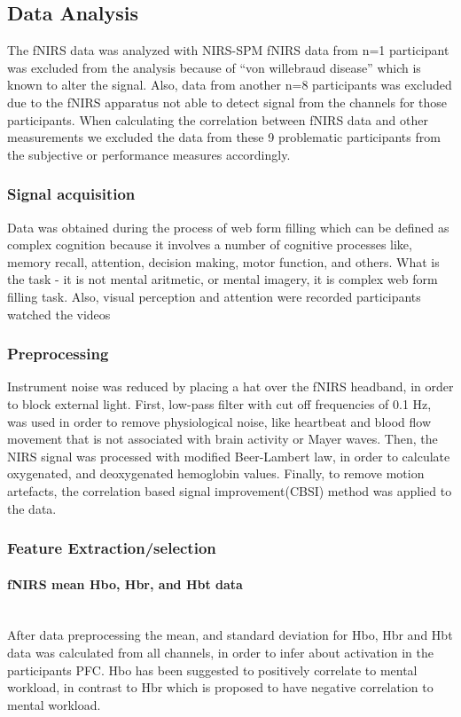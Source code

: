 \documentclass[a4paper]{report}
\begin{document}
		\subsection{Data Analysis}
		The fNIRS data was analyzed with NIRS-SPM\cite{ye2009nirs}		
		fNIRS data from n=1 participant was excluded from the analysis because of ``von willebraud disease'' which is known to alter the signal. Also, data from another n=8 participants was excluded due to the fNIRS apparatus not able to detect signal from the channels for those participants. When calculating the correlation between fNIRS data and other measurements we excluded the data from these 9 problematic participants from the subjective or performance measures accordingly.
			\subsubsection{Signal acquisition}
			Data was obtained during the process of web form filling which can be defined as complex cognition because it involves a number of cognitive processes like, memory recall, attention, decision making, motor function, and others. What is the task - it is not mental aritmetic, or mental imagery, it is complex web form filling task.
			Also, visual perception and attention were recorded participants watched the videos 
			\subsubsection{Preprocessing}
			Instrument noise was reduced by placing a hat over the fNIRS headband, in order to block external light.
			First, low-pass filter with cut off frequencies of 0.1 Hz, was used in order to remove physiological noise, like heartbeat and blood flow movement that is not associated with brain activity or Mayer waves.
			Then, the NIRS signal was processed with modified Beer-Lambert law\cite{cope1988system}, in order to calculate oxygenated, and deoxygenated hemoglobin values.
			Finally, to remove motion artefacts, the correlation based signal improvement(CBSI)\cite{cui2010functional} method was applied to the data.
			\subsubsection{Feature Extraction/selection}
				\paragraph{fNIRS mean Hbo, Hbr, and Hbt data}\leavevmode\\
				After data preprocessing the mean, and standard deviation for Hbo, Hbr and Hbt data was calculated from all channels, in order to infer about activation in the participants PFC. Hbo has been suggested to positively correlate to mental workload, in contrast to Hbr which is proposed to have negative correlation to mental workload.
\end{document}
